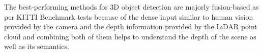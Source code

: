 \documentclass[10pt,twocolumn,letterpaper]{article}
\begin{document}


The best-performing methods for 3D object detection are majorly fusion-based as per KITTI Benchmark tests \cite{KITTI2012} because of the dense input similar to human vision provided by the camera and the depth information provided by the LiDAR point cloud and combining both of them helps to understand the depth of the scene as well as its semantics.
\end{document}

